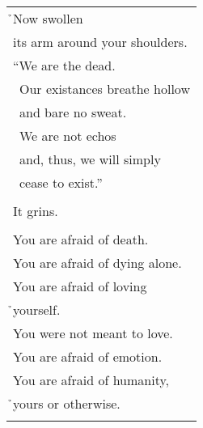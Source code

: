 \documentclass{article}
\begin{document}
\begin{center}
\begin{tabular}{l}
\h{}Now swollen \\
its arm around your shoulders. \\
``We are the dead. \\
\ Our existances breathe hollow \\
\ and bare no sweat. \\
\ We are not echos \\
\ and, thus, we will simply \\
\ cease to exist.'' \\
\\
It grins. \\
\\
You are afraid of death. \\
You are afraid of dying alone. \\
You are afraid of loving \\
\h{}yourself. \\
You were not meant to love. \\
You are afraid of emotion. \\
You are afraid of humanity, \\
\h{}yours or otherwise. \\
\\
\end{tabular}
\end{center}
\end{document}
